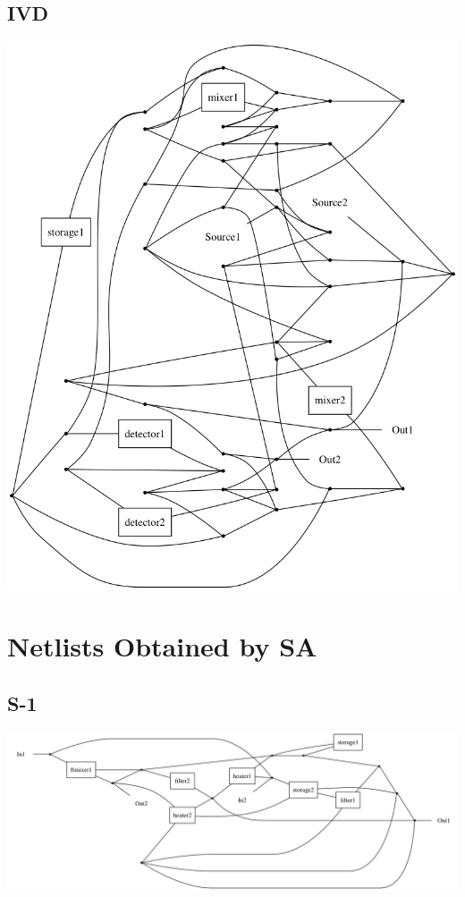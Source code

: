 \subsection{IVD}
\includegraphics[scale=0.35]{figures/archIVD1s.png}

\section{Netlists Obtained by SA}
\subsection{S-1}
\includegraphics[scale=0.25]{figures/ft-sa-arch-mes-example-final.png}

